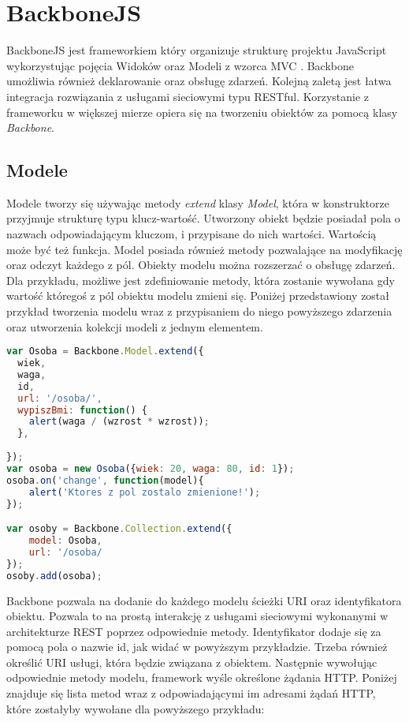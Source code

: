 \section{BackboneJS}
BackboneJS jest frameworkiem który organizuje strukturę projektu JavaScript wykorzystując pojęcia Widoków oraz Modeli z wzorca MVC \cite{backbonejs}. Backbone umożliwia również deklarowanie oraz obsługę zdarzeń. Kolejną zaletą jest łatwa integracja rozwiązania z usługami sieciowymi typu RESTful. Korzystanie z frameworku w większej mierze opiera się na tworzeniu obiektów za pomocą klasy \textit{Backbone}.

\subsection{Modele}
Modele tworzy się używając metody \textit{extend} klasy \textit{Model}, która w konstruktorze przyjmuje strukturę typu klucz-wartość. Utworzony obiekt będzie posiadał pola o nazwach odpowiadającym kluczom, i przypisane do nich wartości. Wartością może być też funkcja. 
Model posiada również metody pozwalające na modyfikację oraz odczyt każdego z pól. Obiekty modelu można rozszerzać o obsługę zdarzeń. Dla przykładu, możliwe jest zdefiniowanie metody, która zostanie wywołana gdy wartość któregoś z pól obiektu modelu zmieni się. 
Poniżej przedstawiony został przykład tworzenia modelu wraz z przypisaniem do niego powyższego zdarzenia oraz utworzenia kolekcji modeli z jednym elementem.
\begin{lstlisting}[language=JavaScript]
var Osoba = Backbone.Model.extend({
  wiek,
  waga,
  id,
  url: '/osoba/',
  wypiszBmi: function() {
  	alert(waga / (wzrost * wzrost));
  },
  
});
var osoba = new Osoba({wiek: 20, waga: 80, id: 1});
osoba.on('change', function(model){
	alert('Ktores z pol zostalo zmienione!');
});

var osoby = Backbone.Collection.extend({
	model: Osoba,
	url: '/osoba/
});
osoby.add(osoba);
\end{lstlisting}

Backbone pozwala na dodanie do każdego modelu ścieżki URI oraz identyfikatora obiektu. Pozwala to na prostą interakcję z usługami sieciowymi wykonanymi w architekturze REST poprzez odpowiednie metody. Identyfikator dodaje się za pomocą pola o nazwie id, jak widać w powyższym przykładzie. Trzeba również określić URI usługi, która będzie związana z obiektem. Następnie wywołując odpowiednie metody modelu, framework wyśle określone żądania HTTP. Poniżej znajduje się lista metod wraz z odpowiadającymi im adresami żądań HTTP, które zostałyby wywołane dla powyższego przykładu:

